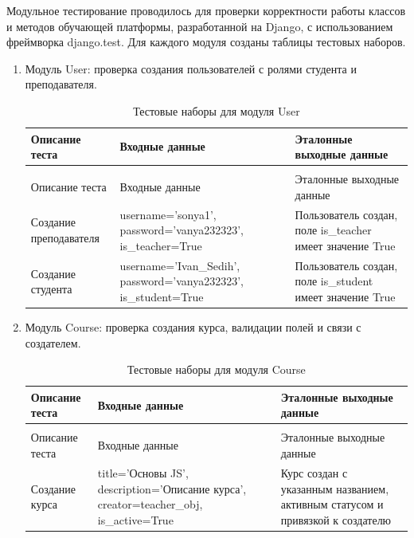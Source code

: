 Модульное тестирование проводилось для проверки корректности работы классов и методов обучающей платформы, разработанной на Django, с использованием фреймворка django.test. Для каждого модуля созданы таблицы тестовых наборов.

\begin{enumerate}
	\item Модуль User: проверка создания пользователей с ролями студента и преподавателя.
	\begin{xltabular}{\textwidth}{|p{3cm}|p{6cm}|p{6cm}|}
		\caption{Тестовые наборы для модуля User\label{tab:user_tests}}\\
		\hline
		Описание теста & Входные данные & Эталонные выходные данные \\ \hline
		\endfirsthead
		\\
		\hline
		Описание теста & Входные данные & Эталонные выходные данные \\ \hline
		\endhead
		Создание преподавателя & username='sonya1', password='vanya232323', is\_teacher=True & Пользователь создан, поле is\_teacher имеет значение True \\ \hline
		Создание студента & username='Ivan\_Sedih', password='vanya232323', is\_student=True & Пользователь создан, поле is\_student имеет значение True \\ \hline
	\end{xltabular}
	
	\item Модуль Course: проверка создания курса, валидации полей и связи с создателем.
	\begin{xltabular}{\textwidth}{|p{3cm}|p{6cm}|p{6cm}|}
		\caption{Тестовые наборы для модуля Course\label{tab:course_tests}}\\
		\hline
		Описание теста & Входные данные & Эталонные выходные данные \\ \hline
		\endfirsthead
		\\
		\hline
		Описание теста & Входные данные & Эталонные выходные данные \\ \hline
		\endhead
		Создание курса & title='Основы JS', description='Описание курса', creator=teacher\_obj, is\_active=True & Курс создан с указанным названием, активным статусом и привязкой к создателю \\ \hline
	\end{xltabular}
	

\end{enumerate}
